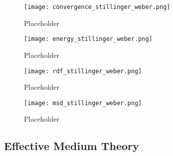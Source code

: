 \begin{figure}[h]
    \centering
    \texttt{[image: convergence\_stillinger\_weber.png]}
    \caption{Placeholder}
    \label{fig:msd}
\end{figure}

\begin{figure}[h]
    \centering
    \texttt{[image: energy\_stillinger\_weber.png]}
    \caption{Placeholder}
    \label{fig:msd}
\end{figure}

\begin{figure}[h]
    \centering
    \texttt{[image: rdf\_stillinger\_weber.png]}
    \caption{Placeholder}
    \label{fig:msd}
\end{figure}

\begin{figure}[h]
    \centering
    \texttt{[image: msd\_stillinger\_weber.png]}
    \caption{Placeholder}
    \label{fig:msd}
\end{figure}

\subsection{Effective Medium Theory}
